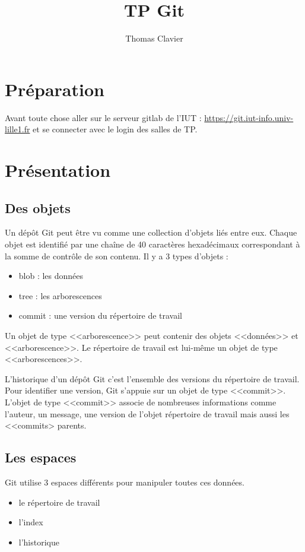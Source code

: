 \documentclass[a4paper]{article}
\title{TP Git}
\author{Thomas Clavier}
\date{}
\begin{document}
\maketitle

\section*{Préparation}
Avant toute chose aller sur le serveur gitlab de l'IUT : \url{https://git.iut-info.univ-lille1.fr} et se connecter avec le login des salles de TP.

\section*{Présentation}

\subsection*{Des objets}
Un dépôt Git peut être vu comme une collection d’objets liés entre eux. 
Chaque objet est identifié par une chaîne de 40 caractères hexadécimaux
correspondant à la somme de contrôle de son contenu. 
Il y a 3 types d'objets : 
\begin{itemize}
\item blob : les données
\item tree : les arborescences
\item commit : une version du répertoire de travail
\end{itemize}
Un objet de type <<arborescence>> peut contenir des objets <<données>> et <<arborescence>>.
Le répertoire de travail est lui-même un objet de type <<arborescences>>. 

L'historique d'un dépôt Git c'est l'ensemble des versions du répertoire de travail. Pour identifier une version, Git s'appuie sur un objet de type <<commit>>. 
L'objet de type <<commit>> associe de nombreuses informations comme l'auteur, un message, une version de l'objet répertoire de travail mais aussi les <<commits> parents.


\subsection*{Les espaces}
Git utilise 3 espaces différents pour manipuler toutes ces données.
\begin{itemize}
\item le répertoire de travail
\item l'index
\item l'historique
\end{itemize}
\end{document}
